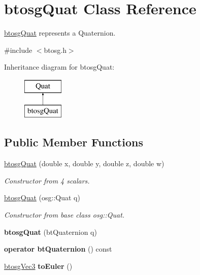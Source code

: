 \hypertarget{classbtosgQuat}{}\section{btosg\+Quat Class Reference}
\label{classbtosgQuat}


\hyperlink{classbtosgQuat}{btosg\+Quat} represents a Quaternion.  




{\ttfamily \#include $<$btosg.\+h$>$}

Inheritance diagram for btosg\+Quat\+:\begin{figure}[H]
\begin{center}
\leavevmode
\includegraphics[height=2.000000cm]{classbtosgQuat}
\end{center}
\end{figure}
\subsection*{Public Member Functions}
\begin{DoxyCompactItemize}
\item 
\hyperlink{classbtosgQuat_a8ef8fc0d1503426d5e0ead87edfa5acf}{btosg\+Quat} (double x, double y, double z, double w)
\begin{DoxyCompactList}\small\item\em Constructor from 4 scalars. \end{DoxyCompactList}\item 
\hyperlink{classbtosgQuat_aa7646a03371b8aaa2caeba3f4b198ad6}{btosg\+Quat} (osg\+::\+Quat q)
\begin{DoxyCompactList}\small\item\em Constructor from base class osg\+::\+Quat. \end{DoxyCompactList}\item 
\mbox{\label{classbtosgQuat_a9fc1530e0eb06c2432f1633bf08db8a2}} 
{\bfseries btosg\+Quat} (bt\+Quaternion q)
\item 
\mbox{\label{classbtosgQuat_addfd68e2130ff8bb51c582524de5a345}} 
{\bfseries operator bt\+Quaternion} () const
\item 
\mbox{\label{classbtosgQuat_aeda394d825b449ab87a77820aad1737d}} 
\hyperlink{classbtosgVec3}{btosg\+Vec3} {\bfseries to\+Euler} ()
\end{DoxyCompactItemize}


